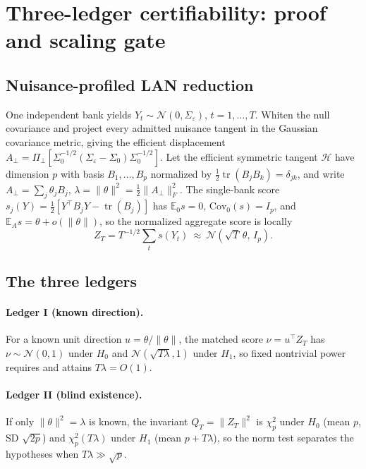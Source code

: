 \documentclass[10pt,onecolumn]{article}
\theoremstyle{plain}
\theoremstyle{definition}
\newcommand{\tr}{\operatorname{tr}}
\newcommand{\eps}{\varepsilon}
\begin{document}
\section{Three-ledger certifiability: proof and scaling gate}\label{sec:s4}
\subsection{Nuisance-profiled LAN reduction}
One independent bank yields $Y_t\sim\mathcal N(0,\Sigma_\eps)$, $t=1,\dots,T$.
Whiten the null covariance and project every admitted nuisance tangent in the
Gaussian covariance metric, giving the efficient displacement
$A_\perp=\Pi_\perp[\Sigma_0^{-1/2}(\Sigma_\eps-\Sigma_0)\Sigma_0^{-1/2}]$. Let the
efficient symmetric tangent $\mathcal H$ have dimension $p$ with basis $B_1,\dots,
B_p$ normalized by $\tfrac12\tr(B_jB_k)=\delta_{jk}$, and write
$A_\perp=\sum_j\theta_jB_j$, $\lambda=\lVert\theta\rVert^2=\tfrac12\lVert
A_\perp\rVert_F^2$. The single-bank score $s_j(Y)=\tfrac12[Y^\top B_jY-\tr(B_j)]$
has $\mathbb E_0 s=0$, $\mathrm{Cov}_0(s)=I_p$, and $\mathbb E_A s=\theta+o(\lVert
\theta\rVert)$, so the normalized aggregate score is locally
\begin{equation}
Z_T=T^{-1/2}\textstyle\sum_t s(Y_t)\ \approx\ \mathcal N(\sqrt T\,\theta,\,I_p).
\label{eq:s-lan}
\end{equation}

\subsection{The three ledgers}
\paragraph{Ledger I (known direction).}
For a known unit direction $u=\theta/\lVert\theta\rVert$, the matched score $\nu=
u^\top Z_T$ has $\nu\sim\mathcal N(0,1)$ under $H_0$ and $\mathcal N(\sqrt{T\lambda},
1)$ under $H_1$, so fixed nontrivial power requires and attains $T\lambda=O(1)$.

\paragraph{Ledger II (blind existence).}
If only $\lVert\theta\rVert^2=\lambda$ is known, the invariant $Q_T=\lVert Z_T
\rVert^2$ is $\chi^2_p$ under $H_0$ (mean $p$, SD $\sqrt{2p}$) and $\chi^2_p(T
\lambda)$ under $H_1$ (mean $p+T\lambda$), so the norm test separates the hypotheses
when $T\lambda\gg\sqrt p$.
\end{document}

